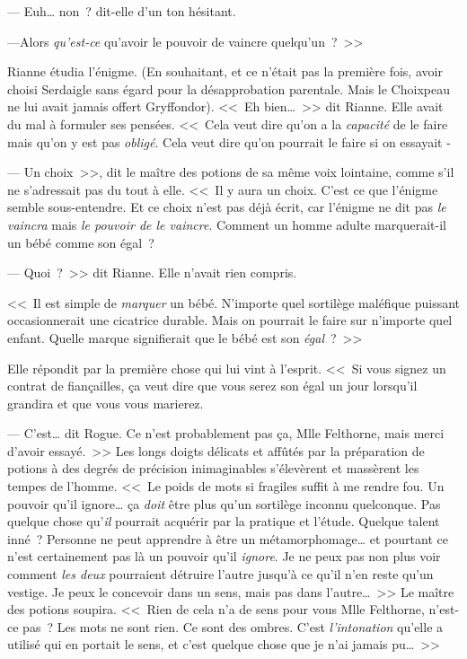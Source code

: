--- Euh… non~? dit-elle d'un ton hésitant.

---Alors \emph{qu'est-ce} qu'avoir le pouvoir de vaincre quelqu'un~?~>>

Rianne étudia l'énigme. (En souhaitant, et ce n'était pas la première fois, avoir choisi Serdaigle sans égard pour la désapprobation parentale. Mais le Choixpeau ne lui avait jamais offert Gryffondor). <<~Eh bien…~>> dit Rianne. Elle avait du mal à formuler ses pensées. <<~Cela veut dire qu'on a la \emph{capacité} de le faire mais qu'on y est pas \emph{obligé}. Cela veut dire qu'on pourrait le faire si on essayait -

--- Un choix~>>, dit le maître des potions de sa même voix lointaine, comme s'il ne s'adressait pas du tout à elle. <<~Il y aura un choix. C'est ce que l'énigme semble sous-entendre. Et ce choix n'est pas déjà écrit, car l'énigme ne dit pas \emph{le vaincra} mais \emph{le pouvoir de le vaincre}. Comment un homme adulte marquerait-il un bébé comme son égal~?

--- Quoi~?~>> dit Rianne. Elle n'avait rien compris.

<<~Il est simple de \emph{marquer} un bébé. N'importe quel sortilège maléfique puissant occasionnerait une cicatrice durable. Mais on pourrait le faire sur n'importe quel enfant. Quelle marque signifierait que le bébé est son \emph{égal}~?~>>

Elle répondit par la première chose qui lui vint à l'esprit. <<~Si vous signez un contrat de fiançailles, ça veut dire que vous serez son égal un jour lorsqu'il grandira et que vous vous marierez.

--- C'est… dit Rogue. Ce n'est probablement pas ça, Mlle Felthorne, mais merci d'avoir essayé.~>> Les longs doigts délicats et affûtés par la préparation de potions à des degrés de précision inimaginables s'élevèrent et massèrent les tempes de l'homme. <<~Le poids de mots si fragiles suffit à me rendre fou. Un pouvoir qu'il ignore… ça \emph{doit} être plus qu'un sortilège inconnu quelconque. Pas quelque chose qu'\emph{il} pourrait acquérir par la pratique et l'étude. Quelque talent inné~? Personne ne peut apprendre à être un métamorphomage… et pourtant ce n'est certainement pas là un pouvoir qu'il \emph{ignore}. Je ne peux pas non plus voir comment \emph{les deux} pourraient détruire l'autre jusqu'à ce qu'il n'en reste qu'un vestige. Je peux le concevoir dans un sens, mais pas dans l'autre…~>> Le maître des potions soupira. <<~Rien de cela n'a de sens pour vous Mlle Felthorne, n'est-ce pas~? Les mots ne sont rien. Ce sont des ombres. C'est \emph{l'intonation} qu'elle a utilisé qui en portait le sens, et c'est quelque chose que je n'ai jamais pu…~>>

